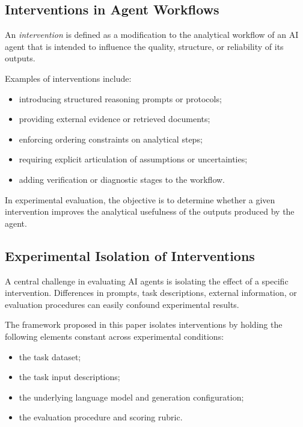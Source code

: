 \subsection{Interventions in Agent Workflows}

An \emph{intervention} is defined as a modification to the analytical
workflow of an AI agent that is intended to influence the quality,
structure, or reliability of its outputs.

Examples of interventions include:

\begin{itemize}

\item introducing structured reasoning prompts or protocols;

\item providing external evidence or retrieved documents;

\item enforcing ordering constraints on analytical steps;

\item requiring explicit articulation of assumptions or uncertainties;

\item adding verification or diagnostic stages to the workflow.

\end{itemize}

In experimental evaluation, the objective is to determine whether a given
intervention improves the analytical usefulness of the outputs produced by
the agent.

\subsection{Experimental Isolation of Interventions}

A central challenge in evaluating AI agents is isolating the effect of a
specific intervention. Differences in prompts, task descriptions, external
information, or evaluation procedures can easily confound experimental
results.

The framework proposed in this paper isolates interventions by holding the
following elements constant across experimental conditions:

\begin{itemize}

\item the task dataset;
\item the task input descriptions;
\item the underlying language model and generation configuration;
\item the evaluation procedure and scoring rubric.
\end{itemize}

